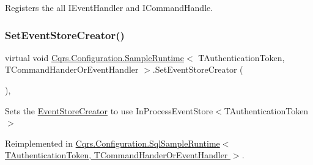 Registers the all I\+Event\+Handler and I\+Command\+Handle. 

\mbox{\label{classCqrs_1_1Configuration_1_1SampleRuntime_a08ac580aad6ab03f16fd3171f21dfe59_a08ac580aad6ab03f16fd3171f21dfe59}} 
\subsubsection{\texorpdfstring{Set\+Event\+Store\+Creator()}{SetEventStoreCreator()}}
{\footnotesize\ttfamily virtual void \hyperlink{classCqrs_1_1Configuration_1_1SampleRuntime}{Cqrs.\+Configuration.\+Sample\+Runtime}$<$ T\+Authentication\+Token, T\+Command\+Hander\+Or\+Event\+Handler $>$.Set\+Event\+Store\+Creator (\begin{DoxyParamCaption}{ }\end{DoxyParamCaption})\hspace{0.3cm}{\ttfamily [protected]}, {\ttfamily [virtual]}}



Sets the \hyperlink{classCqrs_1_1Configuration_1_1SampleRuntime_a9038dd478bcafb2f5f65cbcbada712db_a9038dd478bcafb2f5f65cbcbada712db}{Event\+Store\+Creator} to use In\+Process\+Event\+Store$<$\+T\+Authentication\+Token$>$ 



Reimplemented in \hyperlink{classCqrs_1_1Configuration_1_1SqlSampleRuntime_ae2fedd0697e72a1283a098c809d832c9_ae2fedd0697e72a1283a098c809d832c9}{Cqrs.\+Configuration.\+Sql\+Sample\+Runtime$<$ T\+Authentication\+Token, T\+Command\+Hander\+Or\+Event\+Handler $>$}.

\mbox{\label{classCqrs_1_1Configuration_1_1SampleRuntime_a1593df9e75becc36fee1f15b2be14ec4_a1593df9e75becc36fee1f15b2be14ec4}} 
